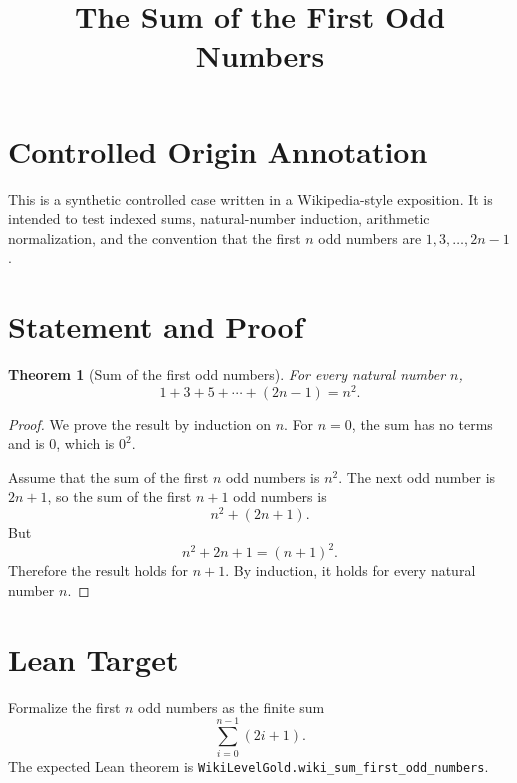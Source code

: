 \documentclass[11pt]{article}
\title{The Sum of the First Odd Numbers}
\author{}
\date{}
\newtheorem{theorem}{Theorem}
\begin{document}
\maketitle

\section*{Controlled Origin Annotation}
This is a synthetic controlled case written in a Wikipedia-style exposition.
It is intended to test indexed sums, natural-number induction, arithmetic
normalization, and the convention that the first $n$ odd numbers are
$1,3,\ldots,2n-1$.

\section*{Statement and Proof}

\begin{theorem}[Sum of the first odd numbers]
For every natural number $n$,
\[
  1 + 3 + 5 + \cdots + (2n-1) = n^2.
\]
\end{theorem}

\begin{proof}
We prove the result by induction on $n$. For $n=0$, the sum has no terms and
is $0$, which is $0^2$.

Assume that the sum of the first $n$ odd numbers is $n^2$. The next odd number
is $2n+1$, so the sum of the first $n+1$ odd numbers is
\[
  n^2 + (2n+1).
\]
But
\[
  n^2 + 2n + 1 = (n+1)^2.
\]
Therefore the result holds for $n+1$. By induction, it holds for every natural
number $n$.
\end{proof}

\section*{Lean Target}
Formalize the first $n$ odd numbers as the finite sum
\[
  \sum_{i=0}^{n-1} (2i+1).
\]
The expected Lean theorem is \texttt{WikiLevelGold.wiki\_sum\_first\_odd\_numbers}.
\end{document}

